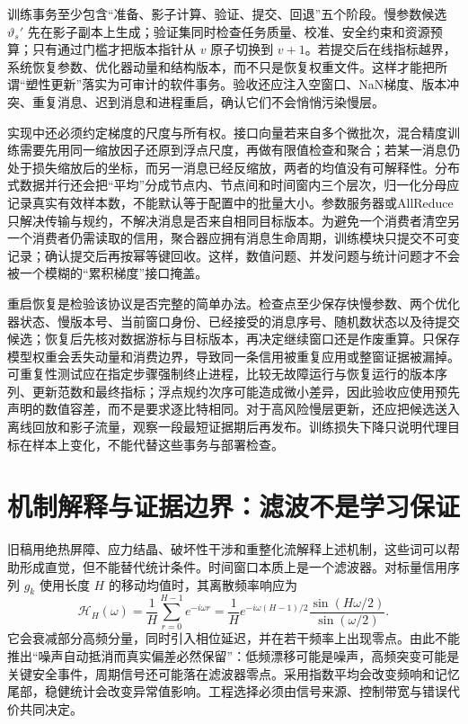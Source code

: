 训练事务至少包含“准备、影子计算、验证、提交、回退”五个阶段。慢参数候选 $\vartheta_s'$ 先在影子副本上生成；验证集同时检查任务质量、校准、安全约束和资源预算；只有通过门槛才把版本指针从 $v$ 原子切换到 $v+1$。若提交后在线指标越界，系统恢复参数、优化器动量和结构版本，而不只是恢复权重文件。这样才能把所谓“塑性更新”落实为可审计的软件事务。验收还应注入空窗口、NaN梯度、版本冲突、重复消息、迟到消息和进程重启，确认它们不会悄悄污染慢层。

实现中还必须约定梯度的尺度与所有权。接口向量若来自多个微批次，混合精度训练需要先用同一缩放因子还原到浮点尺度，再做有限值检查和聚合；若某一消息仍处于损失缩放后的坐标，而另一消息已经反缩放，两者的均值没有可解释性。分布式数据并行还会把“平均”分成节点内、节点间和时间窗内三个层次，归一化分母应记录真实有效样本数，不能默认等于配置中的批量大小。参数服务器或AllReduce只解决传输与规约，不解决消息是否来自相同目标版本。为避免一个消费者清空另一个消费者仍需读取的信用，聚合器应拥有消息生命周期，训练模块只提交不可变记录；确认提交后再按幂等键回收。这样，数值问题、并发问题与统计问题才不会被一个模糊的“累积梯度”接口掩盖。

重启恢复是检验该协议是否完整的简单办法。检查点至少保存快慢参数、两个优化器状态、慢版本号、当前窗口身份、已经接受的消息序号、随机数状态以及待提交候选；恢复后先核对数据游标与目标版本，再决定继续窗口还是作废重算。只保存模型权重会丢失动量和消费边界，导致同一条信用被重复应用或整窗证据被漏掉。可重复性测试应在指定步骤强制终止进程，比较无故障运行与恢复运行的版本序列、更新范数和最终指标；浮点规约次序可能造成微小差异，因此验收应使用预先声明的数值容差，而不是要求逐比特相同。对于高风险慢层更新，还应把候选送入离线回放和影子流量，观察一段最短证据期后再发布。训练损失下降只说明代理目标在样本上变化，不能代替这些事务与部署检查。

\section{机制解释与证据边界：滤波不是学习保证}
\label{sec:app_physical_interpretation}

旧稿用绝热屏障、应力结晶、破坏性干涉和重整化流解释上述机制，这些词可以帮助形成直觉，但不能替代统计条件。时间窗口本质上是一个滤波器。对标量信用序列 $g_k$ 使用长度 $H$ 的移动均值时，其离散频率响应为
\begin{equation}
 \mathcal H_H(\omega)=\frac{1}{H}\sum_{r=0}^{H-1}e^{-i\omega r}
 =\frac{1}{H}e^{-i\omega(H-1)/2}
 \frac{\sin(H\omega/2)}{\sin(\omega/2)}.
\end{equation}
它会衰减部分高频分量，同时引入相位延迟，并在若干频率上出现零点。由此不能推出“噪声自动抵消而真实偏差必然保留”：低频漂移可能是噪声，高频突变可能是关键安全事件，周期信号还可能落在滤波器零点。采用指数平均会改变频响和记忆尾部，稳健统计会改变异常值影响。工程选择必须由信号来源、控制带宽与错误代价共同决定。


